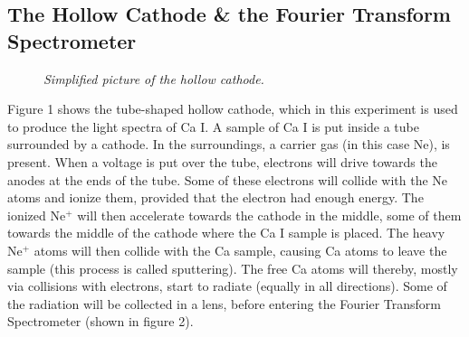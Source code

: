 \documentclass[a4paper]{article}
\begin{document}
\subsection{The Hollow Cathode \& the Fourier Transform Spectrometer}

\begin{figure}[htb!]
\label{HC}
\begin{center}
\end{center}
\caption{\textit{Simplified picture of the hollow cathode.}}
\end{figure}

Figure 1 shows the tube-shaped hollow cathode, which in this experiment is used to produce the light spectra of Ca I. A sample of Ca I is put inside a tube surrounded by a cathode. In the surroundings, a carrier gas (in this case Ne), is present. When a voltage is put over the tube, electrons will drive towards the anodes at the ends of the tube. Some of these electrons will collide with the Ne atoms and ionize them, provided that the electron had enough energy. The ionized Ne$^+$ will then accelerate towards the cathode in the middle, some of them towards the middle of the cathode where the Ca I sample is placed. The heavy Ne$^+$ atoms will then collide with the Ca sample, causing Ca atoms to leave the sample (this process is called sputtering). The free Ca atoms will thereby, mostly via collisions with electrons, start to radiate (equally in all directions). Some of the radiation will be collected in a lens, before entering the Fourier Transform Spectrometer (shown in figure 2).
\end{document}
